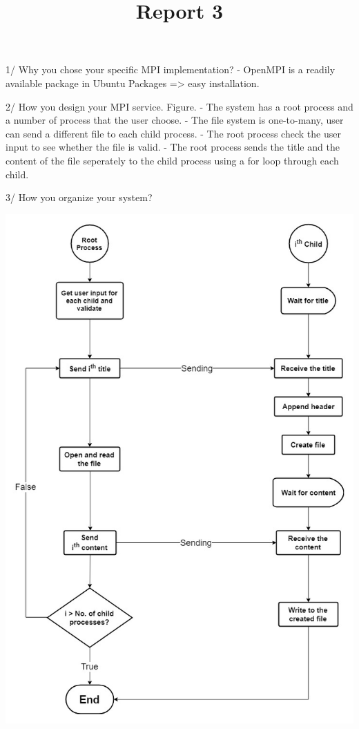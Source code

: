 \documentclass[12pt,a4paper]{article}
\title{Report 3}
\begin{document}
 1/ Why you chose your specific MPI implementation?
- OpenMPI is a readily available package in Ubuntu Packages => easy installation.

2/ How you design your MPI service. Figure.
- The system has a root process and a number of process that the user choose.
- The file system is one-to-many, user can send a different file to each child process.
- The root process check the user input to see whether the file is valid.
- The root process sends the title and the content of the file seperately to the child process using a for loop through each child.

3/ How you organize your system?

\includegraphics[scale=0.6]{03.mpi_flowchart.jpg}
\end{document}
